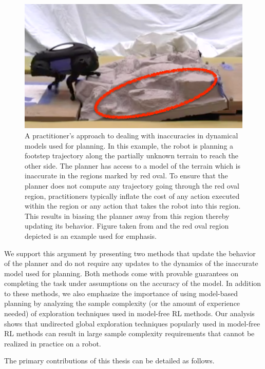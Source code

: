 \begin{figure}[t]
  \centering
  \includegraphics[width=0.5\linewidth]{figures/intro/zucker}
  \caption{A practitioner's approach to dealing with inaccuracies in
    dynamical models used for planning. In this example, the robot is
    planning a footstep trajectory along the partially unknown terrain
  to reach the other side. The planner has access to a model of the
  terrain which is inaccurate in the regions marked by red oval. To
  ensure that the planner does not compute any trajectory going
  through the red oval region, practitioners typically inflate the
  cost of any action executed within the region or any action that
  takes the robot into this region. This results in biasing the
  planner away from this region thereby updating its behavior. Figure
  taken from \cite{DBLP:journals/ijrr/ZuckerRSCBAK11} and the red oval
  region depicted is an example used for emphasis.}
\label{fig:zucker}
\end{figure}

We support this argument by presenting two methods that update the
behavior of the planner and do not require any updates to the dynamics
of the inaccurate model used for planning.  Both methods come with
provable guarantees on completing the task under assumptions on the
accuracy of the model. In addition to these methods, we also emphasize
the importance of using model-based planning
by analyzing the sample complexity (or the amount of experience
needed) of exploration techniques used in model-free RL methods. Our
analysis shows that undirected global exploration techniques popularly
used in model-free RL methods can result in large sample complexity
requirements that cannot be realized in practice on a robot.

The primary contributions of this thesis can be detailed as follows.

